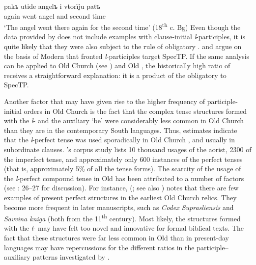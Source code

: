 \documentclass[output=paper,modfonts,newtxmath,hidelinks]{langscibook}
\begin{document}
\ea \label{11:ex20}
	\gll pakъ utide angelъ i vtorïju patъ\\
     again went angel and second time\\
	\glt `The angel went there again for the second time' \hfill (18\textsuperscript{th} c. Bg)
\z
Even though the  data provided by \citet[153--154]{pancheva2005} does not include examples with clause-initial \textit{l}{}-participles, it is quite likely that they were also subject to the rule of obligatory . \citet{broekhuis-migdalski2003} and \citet{migdalski2006} argue on the basis of Modern  that fronted \textit{l}{}-participles target SpecTP. If the same analysis can be applied to Old Church  (see \citealt{willis2000}) and Old , the historically high ratio of  receives a straightforward explanation: it is a product of the obligatory  to SpecTP.

Another factor that may have given rise to the higher frequency of participle-initial orders in Old Church  is the fact that the complex tense structures formed with the \textit{l}{}- and the auxiliary `be' were considerably less common in Old Church  than they are in the contemporary South  languages. Thus,  estimates indicate that the \textit{l}{}-perfect tense was used sporadically in Old Church , and usually in subordinate clauses. \citeauthor{dostal1954}’s corpus study lists 10 thousand usages of the aorist, 2300 of the imperfect tense, and approximately only 600 instances of the perfect tenses (that is, approximately 5\% of all the tense forms). The scarcity of the usage of the \textit{l}{}-perfect compound tense in Old  has been attributed to a number of factors (see \citealt{migdalski2006}: 26--27 for discussion). For instance, \citeauthor{bartula1981} (\citeyear[100]{bartula1981}; see also \citealt{damborsky1967}) notes that there are few examples of present perfect structures in the earliest Old Church  relics. They become more frequent in later manuscripts, such as \textit{Codex Suprasliensis} and \textit{Savvina kniga} (both from the 11\textsuperscript{th} century). Most likely, the structures formed with the \textit{l}{}- may have felt too novel and innovative for formal biblical texts. The fact that these structures were far less common in Old  than in present-day  languages may have repercussions for the different ratios in the participle--auxiliary patterns investigated by \citet{pancheva2008}.
\end{document}

